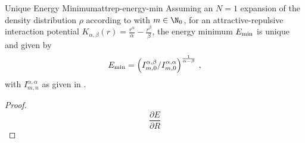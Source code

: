 \begin{lemma}{Unique Energy Minimum}{attrep-energy-min}
  Assuming an $N=1$ expansion of the density distribution $\rho$ according to  with $m \in \N_0$, for an attractive-repulsive interaction potential $K_{\alpha, \beta}(r) = \frac{r^\alpha}{\alpha} - \frac{r^\beta}{\beta}$, the energy minimum $E_{\rm min}$ is unique and given by
  $$E_{\rm min} = \left({I_{m,0}^{\alpha,\beta} / I_{m,0}^{\alpha,\alpha}}\right)^\frac{1}{\alpha-\beta}\,,$$
  with $I_{m,n}^{\alpha,\alpha}$ as given in .
\end{lemma}
\begin{proof}
  $$\frac{\partial E}{\partial R}$$
\end{proof}
